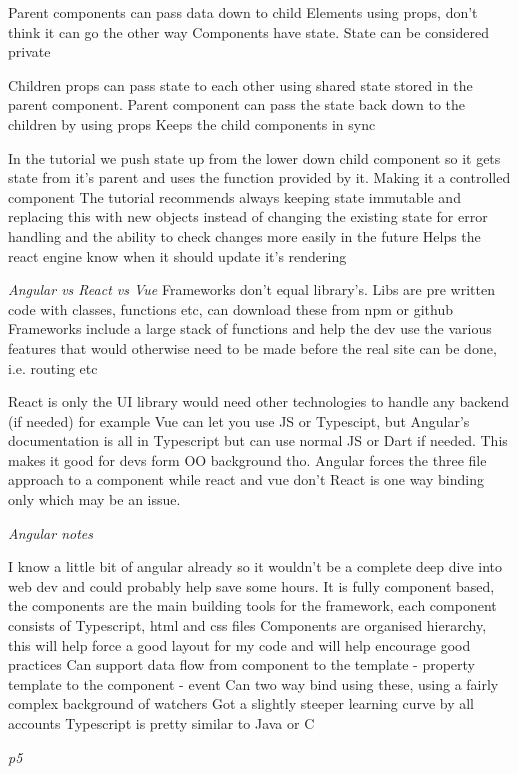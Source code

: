 \documentclass{l4proj}
\begin{document}
Parent components can pass data down to child Elements using props, don't think it can go the other way 
Components have state. State can be considered private 

Children props can pass state to each other using shared state stored in the parent component. Parent component can pass the state back down to the children by using props
Keeps the child components in sync

In the tutorial we push state up from the lower down child component so it gets state from it's parent and uses the function provided by it. Making it a controlled component
The tutorial recommends always keeping state immutable and replacing this with new objects instead of changing the existing state for error handling and the ability to check changes more easily in the future
Helps the react engine know when it should update it's rendering 

\emph{Angular vs React vs Vue} 
Frameworks don't equal library's. Libs are pre written code with classes, functions etc, can download these from npm or github
Frameworks include a large stack of functions and help the dev use the various features that would otherwise need to be made before the real site can be done, i.e. routing etc

React is only the UI library would need other technologies to handle any backend (if needed) for example
Vue can let you use JS or Typescipt, but Angular's documentation is all in Typescript but can use normal JS or Dart if needed. 
This makes it good for devs form OO background tho. Angular forces the three file approach to a component while react and vue don't
React is one way binding only which may be an issue. 

\emph{Angular notes} 

I know a little bit of angular already so it wouldn't be a complete deep dive into web dev and could probably help save some hours.
It is fully component based, the components are the main building tools for the framework, each component consists of Typescript, html and css files 
Components are organised hierarchy, this will help force a good layout for my code and will help encourage good practices 
Can support data flow from component to the template - property
    template to the component - event
Can two way bind using these, using a fairly complex background of watchers
Got a slightly steeper learning curve by all accounts 
Typescript is pretty similar to Java or C

\emph{p5}
\end{document}
